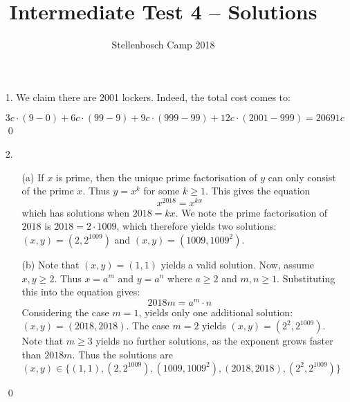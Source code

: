 \documentclass{article}
\title{Intermediate Test 4 -- Solutions}
\author{Stellenbosch Camp 2018}
\date{\vspace{-12pt}}
\begin{document}
\maketitle

\begin{enumerate}[1.]

\item[1.]  We claim there are 2001 lockers. Indeed, the total cost comes to:

\begin{equation*}
    3c \cdot (9 - 0) + 6c \cdot (99 - 9) + 9c \cdot (999 - 99) + 12c \cdot (2001 - 999) = 20691c
\end{equation*}
\qed
\vspace{5mm}


\item[2.]   

\begin{enumerate}
    \item[(a)]  If $x$ is prime, then the unique prime factorisation of $y$ can only consist of the prime $x$. Thus $y = x^k$ for some $k \geq 1$. This gives the equation
    \begin{equation*}
        x^{2018} = x^{kx}
    \end{equation*}
    which has solutions when $2018 = kx$. We note the prime factorisation of $2018$ is $2018 = 2 \cdot 1009$, which therefore yields two solutions: $(x, y) = (2, 2^{1009})$ and $(x, y) = (1009, 1009^2)$.
    
    \item[(b)]  Note that $(x, y) = (1, 1)$ yields a valid solution. Now, assume $x, y \geq 2$. Thus $x = a^m$ and $y = a^n$ where $a \geq 2$ and $m, n \geq 1$. Substituting this into the equation gives:
    \begin{equation*}
        2018m = a^m \cdot n
    \end{equation*}
    Considering the case $m = 1$, yields only one additional solution: $(x, y) = (2018, 2018)$. The case $m = 2$ yields $(x, y) = (2^2, 2^{1009})$. Note that $m \geq 3$ yields no further solutions, as the exponent grows faster than $2018m$. Thus the solutions are
    \begin{equation*}
        (x, y) \in \{(1, 1), (2, 2^{1009}), (1009, 1009^2), (2018, 2018), (2^2, 2^{1009}) \}
    \end{equation*}
    
    
\end{enumerate}

\qed



\end{enumerate}
\end{document}
